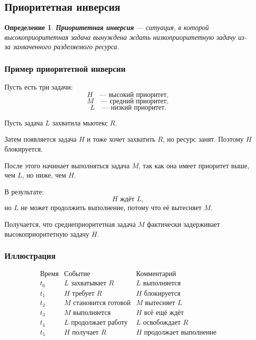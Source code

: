 \documentclass[12pt,a4paper]{article}
\newtheorem{definition}{Определение}
\begin{document}
\subsection{Приоритетная инверсия}

\begin{definition}
\textbf{Приоритетная инверсия} --- ситуация, в которой высокоприоритетная задача вынуждена ждать низкоприоритетную задачу из-за захваченного разделяемого ресурса.
\end{definition}

\subsubsection{Пример приоритетной инверсии}

Пусть есть три задачи:
\[
    H \quad \text{--- высокий приоритет},
\]
\[
    M \quad \text{--- средний приоритет},
\]
\[
    L \quad \text{--- низкий приоритет}.
\]

Пусть задача $L$ захватила мьютекс $R$.

Затем появляется задача $H$ и тоже хочет захватить $R$, но ресурс занят. Поэтому $H$ блокируется.

После этого начинает выполняться задача $M$, так как она имеет приоритет выше, чем $L$, но ниже, чем $H$.

В результате:
\[
    H \text{ ждёт } L,
\]
но $L$ не может продолжить выполнение, потому что её вытесняет $M$.

Получается, что среднеприоритетная задача $M$ фактически задерживает высокоприоритетную задачу $H$.

\subsubsection{Иллюстрация}

\[
\begin{array}{c|c|l}
\text{Время} & \text{Событие} & \text{Комментарий} \\
\hline
t_0 & L \text{ захватывает } R & L \text{ выполняется} \\
t_1 & H \text{ требует } R & H \text{ блокируется} \\
t_2 & M \text{ становится готовой} & M \text{ вытесняет } L \\
t_3 & M \text{ выполняется} & H \text{ всё ещё ждёт} \\
t_4 & L \text{ продолжает работу} & L \text{ освобождает } R \\
t_5 & H \text{ получает } R & H \text{ продолжает выполнение}
\end{array}
\]
\end{document}
